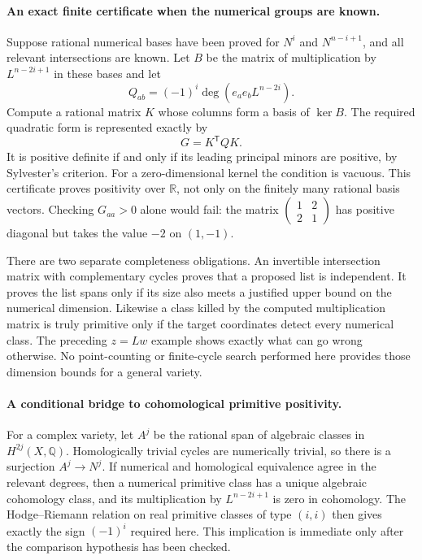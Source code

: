 \documentclass[11pt]{article}
\begin{document}
\paragraph{An exact finite certificate when the numerical groups are known.}
Suppose rational numerical bases have been proved for $N^i$ and
$N^{n-i+1}$, and all relevant intersections are known. Let $B$ be the
matrix of multiplication by $L^{n-2i+1}$ in these bases and let
\[
 Q_{ab}=(-1)^i\deg(e_ae_bL^{n-2i}).
\]
Compute a rational matrix $K$ whose columns form a basis of $\ker B$.
The required quadratic form is represented exactly by
\begin{equation}\label{nh:certificate}
 G=K^{\mathsf T}QK.
\end{equation}
It is positive definite if and only if its leading principal minors
are positive, by Sylvester's criterion. For a zero-dimensional kernel
the condition is vacuous. This certificate proves positivity over
$\mathbb R$, not only on the finitely many rational basis vectors.
Checking $G_{aa}>0$ alone would fail: the matrix
$\left(\begin{smallmatrix}1&2\\2&1\end{smallmatrix}\right)$ has
positive diagonal but takes the value $-2$ on $(1,-1)$.

There are two separate completeness obligations. An invertible
intersection matrix with complementary cycles proves that a proposed
list is independent. It proves the list spans only if its size also
meets a justified upper bound on the numerical dimension. Likewise a
class killed by the computed multiplication matrix is truly primitive
only if the target coordinates detect every numerical class. The
preceding $z=Lw$ example shows exactly what can go wrong otherwise.
No point-counting or finite-cycle search performed here provides those
dimension bounds for a general variety.

\paragraph{A conditional bridge to cohomological primitive positivity.}
For a complex variety, let $A^j$ be the rational span of algebraic
classes in $H^{2j}(X,\mathbb Q)$. Homologically trivial cycles are
numerically trivial, so there is a surjection $A^j\to N^j$.
If numerical and homological equivalence agree in the relevant degrees,
then a numerical primitive class has a unique algebraic cohomology
class, and its multiplication by $L^{n-2i+1}$ is zero in cohomology.
The Hodge--Riemann relation on real primitive classes of type $(i,i)$
then gives exactly the sign $(-1)^i$ required here. This implication
is immediate only after the comparison hypothesis has been checked.
\end{document}
